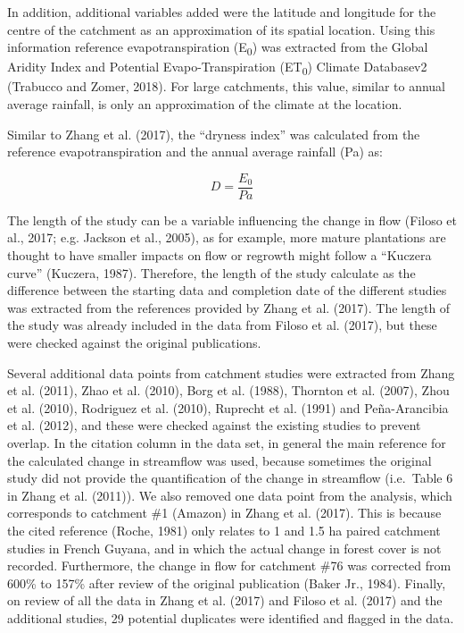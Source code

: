 \documentclass[]{elsarticle} %
\begin{document}
In addition, additional variables added were the latitude and longitude for the centre of the catchment as an approximation of its spatial location. Using this information reference evapotranspiration (E\textsubscript{0}) was extracted from the Global Aridity Index and Potential Evapo-Transpiration (ET\textsubscript{0}) Climate Databasev2 (Trabucco and Zomer, 2018). For large catchments, this value, similar to annual average rainfall, is only an approximation of the climate at the location.

Similar to Zhang et al. (2017), the ``dryness index'' was calculated from the reference evapotranspiration and the annual average rainfall (Pa) as:

\begin{equation}
D = \frac{E_{0}}{Pa} \label{eq:eq1}
\end{equation}

The length of the study can be a variable influencing the change in flow (Filoso et al., 2017; e.g. Jackson et al., 2005), as for example, more mature plantations are thought to have smaller impacts on flow or regrowth might follow a ``Kuczera curve'' (Kuczera, 1987). Therefore, the length of the study calculate as the difference between the starting data and completion date of the different studies was extracted from the references provided by Zhang et al. (2017). The length of the study was already included in the data from Filoso et al. (2017), but these were checked against the original publications.

Several additional data points from catchment studies were extracted from Zhang et al. (2011), Zhao et al. (2010), Borg et al. (1988), Thornton et al. (2007), Zhou et al. (2010), Rodriguez et al. (2010), Ruprecht et al. (1991) and Peña-Arancibia et al. (2012), and these were checked against the existing studies to prevent overlap. In the citation column in the data set, in general the main reference for the calculated change in streamflow was used, because sometimes the original study did not provide the quantification of the change in streamflow (i.e.~Table 6 in Zhang et al. (2011)).
We also removed one data point from the analysis, which corresponds to catchment \#1 (Amazon) in Zhang et al. (2017). This is because the cited reference (Roche, 1981) only relates to 1 and 1.5 ha paired catchment studies in French Guyana, and in which the actual change in forest cover is not recorded. Furthermore, the change in flow for catchment \#76 was corrected from 600\% to 157\% after review of the original publication (Baker Jr., 1984). Finally, on review of all the data in Zhang et al. (2017) and Filoso et al. (2017) and the additional studies, 29 potential duplicates were identified and flagged in the data.
\end{document}
